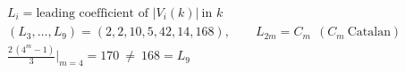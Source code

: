 \documentclass{article}
\begin{document}
\[
\begin{aligned}
&L_i=\text{leading coefficient of }|V_i(k)|\ \text{in }k\\
&(L_3,\dots,L_9)=(2,2,10,5,42,14,168),\qquad L_{2m}=C_m\ \ (C_m\ \text{Catalan})\\
&\frac{2\,(4^{m}-1)}{3}\Big|_{m=4}=170\ \neq\ 168=L_9
\end{aligned}
\]
\end{document}
